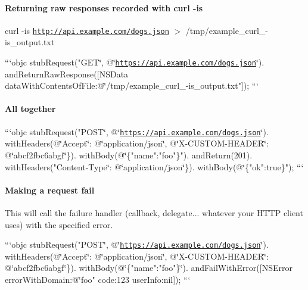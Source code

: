 \paragraph*{Returning raw responses recorded with {\ttfamily curl -\/is}}

{\ttfamily curl -\/is \href{http://api.example.com/dogs.json}{\tt http\-://api.\-example.\-com/dogs.\-json} $>$ /tmp/example\-\_\-curl\-\_\--\/is\-\_\-output.txt}

```objc stub\-Request("G\-E\-T\char`\"{}, @\char`\"{}\href{https://api.example.com/dogs.json}{\tt https\-://api.\-example.\-com/dogs.\-json}\char`\"{}).
and\-Return\-Raw\-Response(\mbox{[}\-N\-S\-Data data\-With\-Contents\-Of\-File\-:@\char`\"{}/tmp/example\-\_\-curl\-\_\--\/is\-\_\-output.txt"\mbox{]}); ```

\paragraph*{All together}

```objc stub\-Request("P\-O\-S\-T\char`\"{}, @\char`\"{}\href{https://api.example.com/dogs.json}{\tt https\-://api.\-example.\-com/dogs.\-json}\char`\"{}).
with\-Headers(@\char`\"{}Accept\char`\"{}\-: @\char`\"{}application/json\char`\"{}, @\char`\"{}X-\/\-C\-U\-S\-T\-O\-M-\/\-H\-E\-A\-D\-E\-R\char`\"{}\-: @\char`\"{}abcf2fbc6abgf\char`\"{}\}).
with\-Body(@\char`\"{}\{"name"\-:"foo"\}"). and\-Return(201). with\-Headers("Content-\/\-Type\char`\"{}\-: @\char`\"{}application/json\char`\"{}\}).
with\-Body(@\char`\"{}\{"ok"\-:true\}"); ```

\paragraph*{Making a request fail}

This will call the failure handler (callback, delegate... whatever your H\-T\-T\-P client uses) with the specified error.

```objc stub\-Request("P\-O\-S\-T\char`\"{}, @\char`\"{}\href{https://api.example.com/dogs.json}{\tt https\-://api.\-example.\-com/dogs.\-json}\char`\"{}).
with\-Headers(@\char`\"{}Accept\char`\"{}\-: @\char`\"{}application/json\char`\"{}, @\char`\"{}X-\/\-C\-U\-S\-T\-O\-M-\/\-H\-E\-A\-D\-E\-R\char`\"{}\-: @\char`\"{}abcf2fbc6abgf\char`\"{}\}).
with\-Body(@\char`\"{}\{"name"\-:"foo"\}\char`\"{}).
and\-Fail\-With\-Error(\mbox{[}\-N\-S\-Error error\-With\-Domain\-:@\char`\"{}foo" code\-:123 user\-Info\-:nil\mbox{]}); ```

